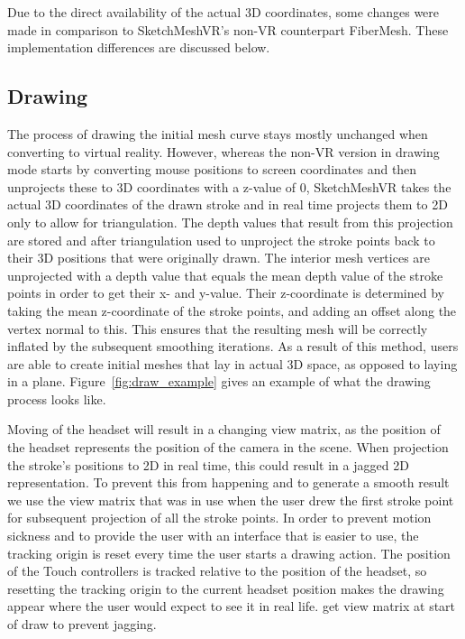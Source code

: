 Due to the direct availability of the actual 3D coordinates, some changes were made in comparison to SketchMeshVR's non-VR counterpart FiberMesh. These implementation differences are discussed below.

\subsection{Drawing}
The process of drawing the initial mesh curve stays mostly unchanged when converting to virtual reality. However, whereas the non-VR version in drawing mode starts by converting mouse positions to screen coordinates and then unprojects these to 3D coordinates with a z-value of 0, SketchMeshVR takes the actual 3D coordinates of the drawn stroke and in real time projects them to 2D only to allow for triangulation. The depth values that result from this projection are stored and after triangulation used to unproject the stroke points back to their 3D positions that were originally drawn. The interior mesh vertices are unprojected with a depth value that equals the mean depth value of the stroke points in order to get their x- and y-value. Their z-coordinate is determined by taking the mean z-coordinate of the stroke points, and adding an offset along the vertex normal to this. This ensures that the resulting mesh will be correctly inflated by the subsequent smoothing iterations. As a result of this method, users are able to create initial meshes that lay in actual 3D space, as opposed to laying in a plane. Figure~\ref{fig:draw_example} gives an example of what the drawing process looks like.

Moving of the headset will result in a changing view matrix, as the position of the headset represents the position of the camera in the scene. When projection the stroke's positions to 2D in real time, this could result in a jagged 2D representation. To prevent this from happening and to generate a smooth result we use the view matrix that was in use when the user drew the first stroke point for subsequent projection of all the stroke points.  
In order to prevent motion sickness and to provide the user with an interface that is easier to use, the tracking origin is reset every time the user starts a drawing action. The position of the Touch controllers is tracked relative to the position of the headset, so resetting the tracking origin to the current headset position makes the drawing appear where the user would expect to see it in real life. 
get view matrix at start of draw to prevent jagging. 

